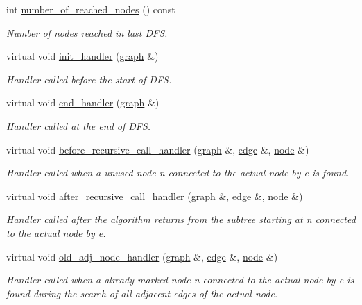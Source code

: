 \begin{DoxyCompactItemize}
int \mbox{\hyperlink{classdfs_ae8849a552721ad4af5d9a81c6da35822}{number\+\_\+of\+\_\+reached\+\_\+nodes}} () const
\begin{DoxyCompactList}\small\item\em Number of nodes reached in last D\+FS. \end{DoxyCompactList}\item 
virtual void \mbox{\hyperlink{classdfs_aae46a50d0c73c63bf72e483668fd22a2}{init\+\_\+handler}} (\mbox{\hyperlink{classgraph}{graph}} \&)
\begin{DoxyCompactList}\small\item\em Handler called before the start of D\+FS. \end{DoxyCompactList}\item 
virtual void \mbox{\hyperlink{classdfs_a59c512fa99ad3809db3e24347ab43b85}{end\+\_\+handler}} (\mbox{\hyperlink{classgraph}{graph}} \&)
\begin{DoxyCompactList}\small\item\em Handler called at the end of D\+FS. \end{DoxyCompactList}\item 
virtual void \mbox{\hyperlink{classdfs_a401190846f59af2a49ba036e99230152}{before\+\_\+recursive\+\_\+call\+\_\+handler}} (\mbox{\hyperlink{classgraph}{graph}} \&, \mbox{\hyperlink{classedge}{edge}} \&, \mbox{\hyperlink{classnode}{node}} \&)
\begin{DoxyCompactList}\small\item\em Handler called when a unused node {\itshape n} connected to the actual node by {\itshape e} is found. \end{DoxyCompactList}\item 
virtual void \mbox{\hyperlink{classdfs_a92fdca8a77b55d08b129aeab4fc66e4c}{after\+\_\+recursive\+\_\+call\+\_\+handler}} (\mbox{\hyperlink{classgraph}{graph}} \&, \mbox{\hyperlink{classedge}{edge}} \&, \mbox{\hyperlink{classnode}{node}} \&)
\begin{DoxyCompactList}\small\item\em Handler called after the algorithm returns from the subtree starting at {\itshape n} connected to the actual node by {\itshape e}. \end{DoxyCompactList}\item 
virtual void \mbox{\hyperlink{classdfs_a33d1d2caa38dd038e03fa4041f5b9521}{old\+\_\+adj\+\_\+node\+\_\+handler}} (\mbox{\hyperlink{classgraph}{graph}} \&, \mbox{\hyperlink{classedge}{edge}} \&, \mbox{\hyperlink{classnode}{node}} \&)
\begin{DoxyCompactList}\small\item\em Handler called when a already marked node {\itshape n} connected to the actual node by {\itshape e} is found during the search of all adjacent edges of the actual node. \end{DoxyCompactList}\item 

\end{DoxyCompactItemize}
